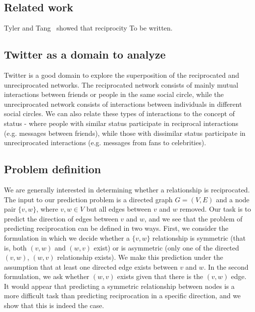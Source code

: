 \documentclass[conference]{IEEEtran}
\begin{document}
\subsection{Related work}
Tyler and Tang~\cite{Tyler:2003tq} showed that reciprocity 
To be written.

\subsection{Twitter as a domain to analyze}
Twitter is a good domain to explore the superposition of the reciprocated and unreciprocated networks. 
The reciprocated network consists of mainly mutual interactions between friends or people in the same social circle, while the unreciprocated network consists of interactions between individuals in different social circles. 
We can also relate these types of interactions to the concept of status - where people with similar status participate in reciprocal interactions (e.g. messages between friends), while those with dissimilar status participate in unreciprocated interactions (e.g. messages from fans to celebrities).

\subsection{Problem definition}
We are generally interested in determining whether a relationship is reciprocated.
The input to our prediction problem is a directed graph $G=(V,E)$ and a node pair $\{v,w\}$, where $v,w \in V$ but all edges between $v$ and $w$ removed. 
Our task is to predict the direction of edges between $v$ and $w$, and we see that the problem of predicting reciprocation can be defined in two ways. 
First, we consider the formulation in which we decide whether a $\{v,w\}$ relationship is symmetric (that is, both $(v,w)$ and $(w,v)$ exist) or is asymmetric (only one of the directed $(v,w)$, $(w,v)$ relationship exists).
We make this prediction under the assumption that at least one directed edge exists between $v$ and $w$. 
In the second formulation, we ask whether $(w,v)$ exists given that there is the $(v,w)$ edge. 
It would appear that predicting a symmetric relationship between nodes is a more difficult task than predicting reciprocation in a specific direction, and we show that this is indeed the case.
\end{document}
